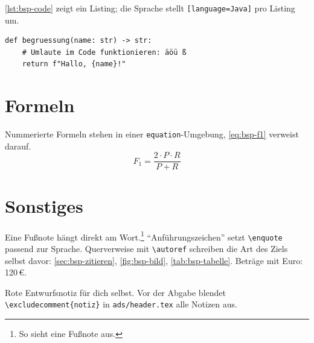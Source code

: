 \autoref{lst:bsp-code} zeigt ein Listing; die Sprache stellt \texttt{[language=Java]} pro Listing um.

\begin{lstlisting}[caption={Beispiel-Listing in Python}, label={lst:bsp-code}]
def begruessung(name: str) -> str:
    # Umlaute im Code funktionieren: äöü ß
    return f"Hallo, {name}!"
\end{lstlisting}

\section{Formeln}\label{sec:bsp-formeln}

Nummerierte Formeln stehen in einer \texttt{equation}-Umgebung, \eqref{eq:bsp-f1} verweist darauf.
\begin{equation}
  F_1 = \frac{2 \cdot P \cdot R}{P + R}
  \label{eq:bsp-f1}
\end{equation}

\section{Sonstiges}\label{sec:bsp-sonstiges}

Eine Fußnote hängt direkt am Wort.\footnote{So sieht eine Fußnote aus.}
\enquote{Anführungszeichen} setzt \texttt{\textbackslash enquote} passend zur Sprache.
Querverweise mit \texttt{\textbackslash autoref} schreiben die Art des Ziels selbst davor: \autoref{sec:bsp-zitieren}, \autoref{fig:bsp-bild}, \autoref{tab:bsp-tabelle}.
Beträge mit Euro: 120\,\euro{}.

\begin{notiz}
Rote Entwurfsnotiz für dich selbst.
Vor der Abgabe blendet \texttt{\textbackslash excludecomment\{notiz\}} in \texttt{ads/header.tex} alle Notizen aus.
\end{notiz}
